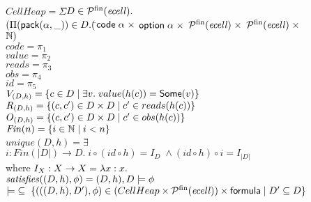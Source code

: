 \begin{figure}
\mbox{}
\begin{tabbing}
$CellHeap = \Sigma$\=$ D \in \mathcal{P}^{\mathrm{fin}}(\mathit{ecell}).$ \\
               \>$(\Pi (\mathsf{pack}({\alpha}, {\_})) \in D. ($\=${\mathsf{code}\;{\alpha}} \;\times$
                                         ${\mathsf{option}{\;\alpha}} \;\times$ 
                                         ${\mathcal{P}^{\mathrm{fin}}(\mathit{ecell})} \;\times$ 
                                         ${\mathcal{P}^{\mathrm{fin}}(\mathit{ecell})} \;\times$ 
                                         $\mathbb{N})$ \\[1em]
       

$code = \pi_1$ \\
$value = \pi_2$ \\
$reads = \pi_3$ \\
$obs = \pi_4$ \\
$id = \pi_5$ \\[1em]

$V_{(D, h)} = \{{{c \in D}\;|\;{\exists v.\; value(h(c)) = \mathsf{Some}(v)}}\}$ \\
$R_{(D, h)} = \{{{(c,c') \in D \times D}\;|\;{ c' \in reads(h(c)) }}\}$ \\
$O_{(D, h)} = \{{{(c,c') \in D \times D}\;|\;{ c' \in obs(h(c)) }}\}$ \\[1em]

$\mathit{Fin}(n) = \{{{ i \in \mathbb{N} }\;|\;{ i < n }}\}$ \\[1em]

$unique(D,h) = \exists$\=$i : Fin(|D|) \to D.\; i \circ (id \circ h) = I_D \; \land (id \circ h) \circ i = I_{|D|}$  \\
where $I_X : X \to X = \fun{x}{x}$ \\[1em]

$\mathit{satisfies}({(D,h)}, {\phi}) = (D,h), D \models \phi$ \\[1em]

$\models \;\subseteq\; \{{{(((D,h), D'), \phi) \in (CellHeap \times \mathcal{P}^{\mathrm{fin}}(\mathit{ecell})) \times \mathsf{formula}}\;|\;{D' \subseteq D}}\}$ \\[0.5em]


\end{tabbing}
\end{figure}
